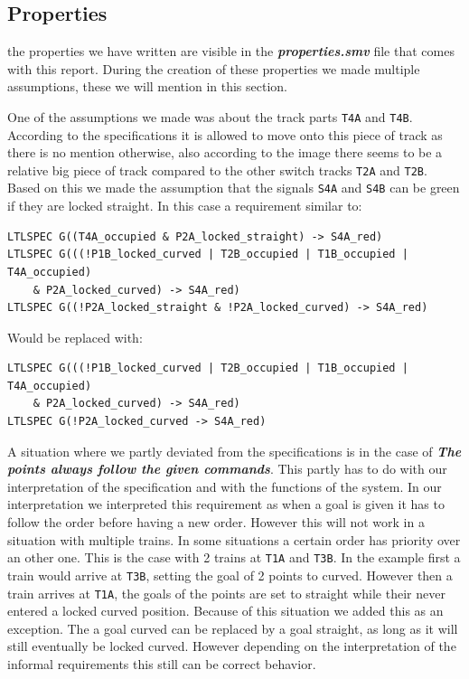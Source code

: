 \documentclass[a4paper]{article}
\begin{document}
	\subsection{Properties}
	the properties we have written are visible in the \textit{\textbf{properties.smv}} file that comes with this report.
	During the creation of these properties we made multiple assumptions, these we will mention in this section.
	
	One of the assumptions we made was about the track parts \texttt{T4A} and \texttt{T4B}. According to the specifications it is allowed to move onto this piece of track as there is no mention otherwise, also according to the image there seems to be a relative big piece of track compared to the other switch tracks \texttt{T2A} and \texttt{T2B}. Based on this we made the assumption that the signals \texttt{S4A} and \texttt{S4B} can be green if they are locked straight. In this case a requirement similar to:
	\begin{lstlisting}
LTLSPEC G((T4A_occupied & P2A_locked_straight) -> S4A_red)
LTLSPEC G(((!P1B_locked_curved | T2B_occupied | T1B_occupied | T4A_occupied) 
	& P2A_locked_curved) -> S4A_red)
LTLSPEC G((!P2A_locked_straight & !P2A_locked_curved) -> S4A_red)
	\end{lstlisting}
	Would be replaced with:
	\begin{lstlisting}
LTLSPEC G(((!P1B_locked_curved | T2B_occupied | T1B_occupied | T4A_occupied) 
	& P2A_locked_curved) -> S4A_red)
LTLSPEC G(!P2A_locked_curved -> S4A_red)
	\end{lstlisting}
	
	A situation where we partly deviated from the specifications is in the case of \textit{\textbf{The points always follow the given commands}}. This partly has to do with our interpretation of the specification and with the functions of the system. In our interpretation we interpreted this requirement as when a goal is given it has to follow the order before having a new order. However this will not work in a situation with multiple trains. In some situations a certain order has priority over an other one. This is the case with 2 trains at \texttt{T1A} and \texttt{T3B}. In the example first a train would arrive at \texttt{T3B}, setting the goal of 2 points to curved. However then a train arrives at \texttt{T1A}, the goals of the points are set to straight while their never entered a locked curved position.
	Because of this situation we added this as an exception. The a goal curved can be replaced by a goal straight, as long as it will still eventually be locked curved. However depending on the interpretation of the informal requirements this still can be correct behavior.
	
\end{document}

